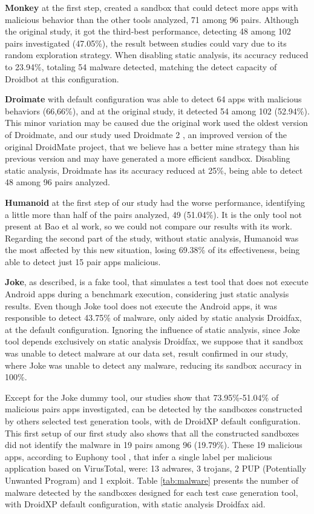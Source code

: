 \textbf{Monkey} at the first step, created a sandbox that could detect more apps with malicious behavior than the other tools analyzed, 71 among 96 pairs. Although the original study, it got the third-best performance, detecting 48 among 102 pairs investigated (47.05\%), the result between studies could vary due to its random exploration strategy. When disabling static analysis, its accuracy reduced to 23.94\%, totaling 54 malware detected, matching the detect capacity of Droidbot at this configuration.

\textbf{Droimate} with default configuration was able to detect 64 apps with malicious behaviors (66,66\%), and at the original study, it detected 54 among 102 (52.94\%). This minor variation may be caused due the original work used the oldest version of Droidmate, and our study used Droidmate 2 \cite{DBLP:conf/kbse/BorgesHZ18}, an improved version of the original DroidMate project, that we believe has a better mine strategy than his previous version and may have generated a more efficient sandbox. Disabling static analysis, Droidmate has its accuracy reduced at 25\%, being able to detect 48 among 96 pairs analyzed.

\textbf{Humanoid} at the first step of our study had the worse performance, identifying a little more than half of the pairs analyzed, 49 (51.04\%). It is the only tool not present at Bao et al work, so we could not compare our results with its work. Regarding the second part of the study, without static analysis, Humanoid was the most affected by this new situation, losing 69.38\% of its effectiveness, being able to detect just 15 pair apps malicious.

\textbf{Joke}, as described, is a fake tool, that simulates a test tool that does not execute Android apps during a benchmark execution, considering just static analysis results. Even though Joke tool does not execute the Android apps, it was responsible to detect 43.75\% of malware, only aided by static analysis Droidfax, at the default configuration. Ignoring the influence of static analysis, since Joke tool depends exclusively on static analysis Droidfax, we suppose that it sandbox was unable to detect malware at our data set, result confirmed in our study, where Joke was unable to detect any malware, reducing its sandbox accuracy in 100\%.

Except for the Joke dummy tool, our studies show that 73.95\%-51.04\% of malicious pairs apps investigated, can be detected by the sandboxes constructed by others selected test generation tools, with de DroidXP default configuration. This first setup of our first study also shows that all the constructed sandboxes did not identify the malware in 19 pairs among 96 (19.79\%). These 19 malicious apps, according to Euphony tool \cite{hurier2017euphony}, that infer a single label per malicious application based on VirusTotal, were: 13 adwares, 3 trojans, 2 PUP (Potentially Unwanted Program) and 1 exploit. Table \ref{tab:malware} presents the number of malware detected by the sandboxes designed for each test case generation tool, with DroidXP default configuration, with static analysis Droidfax aid.

